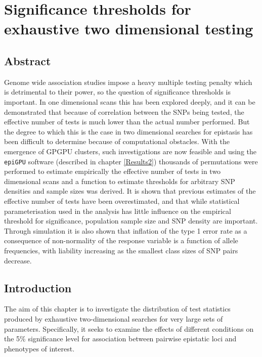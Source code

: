 
\chapter{Significance thresholds for exhaustive two dimensional testing}
\label{Results3}

\section{Abstract}
Genome wide association studies impose a heavy multiple testing penalty which is detrimental to their power, so the question of significance thresholds is important. In one dimensional scans this has been explored deeply, and it can be demonstrated that because of correlation between the SNPs being tested, the effective number of tests is much lower than the actual number performed. But the degree to which this is the case in two dimensional searches for epistasis has been difficult to determine because of computational obstacles. With the emergence of GPGPU clusters, such investigations are now feasible and using the {\tt epiGPU} software (described in chapter \ref{Results2}) thousands of permutations were performed to estimate empirically the effective number of tests in two dimensional scans and a function to estimate thresholds for arbitrary SNP densities and sample sizes was derived. It is shown that previous estimates of the effective number of tests have been overestimated, and that while statistical parameterisation used in the analysis has little influence on the empirical threshold for significance, population sample size and SNP density are important. Through simulation it is also shown that inflation of the type 1 error rate as a consequence of non-normality of the response variable is a function of allele frequencies, with liability increasing as the smallest class sizes of SNP pairs decrease.

\section{Introduction}
The aim of this chapter is to investigate the distribution of test statistics produced by exhaustive two-dimensional searches for very large sets of parameters. Specifically, it seeks to examine the effects of different conditions on the 5\% significance level for association between pairwise epistatic loci and phenotypes of interest.


